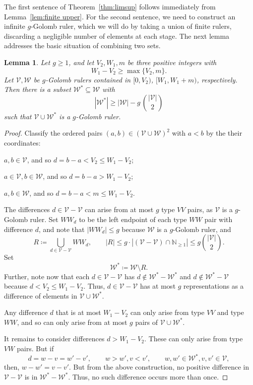 \documentclass[10pt]{article}
\newcommand{\NN}{\ensuremath{\mathbb N}}
\newcommand{\cV}{\mathcal{V}}
\newcommand{\cW}{\mathcal{W}}
\newtheorem{lem}[thm]{Lemma}
\begin{document}
The first sentence of Theorem~\ref{thm:limsup} follows immediately from Lemma~\ref{lem:finite upper}. For the second sentence, we need to construct an infinite $g$-Golomb ruler, which we will do by taking a union of finite rulers, discarding a negligible number of elements at each stage. The next lemma addresses the basic situation of combining two sets.

\begin{lem}\label{lem:splice}
  Let $g \ge 1$, and let $V_2,W_1,m$ be three positive integers with 
  \begin{equation*}
    W_1 - V_2 \ge \max \{V_2, m\}.
  \end{equation*}
  Let $\cV,\cW$ be $g$-Golomb rulers contained in $[0, V_2)$, $[W_1, W_1+m)$, respectively.
  Then there is a subset $\cW^{*} \subseteq \cW$ with
  \begin{equation*}
    |\cW^{*}| \ge |\cW| - g \,\binom{|\cV|}{2}
  \end{equation*}
  such that $\cV \cup \cW^{*}$ is a $g$-Golomb ruler.
\end{lem}

\begin{proof}
Classify the ordered pairs $(a,b)\in (\cV \cup \cW)^2$ with $a<b$ by the their coordinates:
\begin{description}[noitemsep]
    \item[type $VV$:] $a,b\in\cV$, and so $d=b-a< V_2 \le W_1-V_2$;
    \item[type $VW$:] $a\in\cV,b\in \cW$, and so $d=b-a > W_1-V_2$;
    \item[type $WW$:] $a,b\in\cW$, and so $d=b-a < m \le W_1-V_2$.
\end{description}
The differences $d\in \cV-\cV$ can arise from at most $g$ type $VV$ pairs, as $\cV$ is a $g$-Golomb ruler. Set $WW_d$ to be the left endpoint of each type $WW$ pair with difference $d$, and note that $|WW_d| \le g $ because $\cW$ is a $g$-Golomb ruler, and
    \[R \coloneqq \bigcup_{d\in \cV-\cV} WW_d, \qquad \left| R \right| \le g \cdot |(\cV-\cV)\cap\NN_{\ge 1}| \le g \binom{|\cV|}{2}.\]
Set
  \[\cW^{*}\coloneqq \cW\setminus R.\] 
Further, note now that each $d\in \cV-\cV$ has $d\not\in \cW^{*}-\cW^{*}$ and $d\not\in \cW^{*}-\cV$ because $d< V_2 \le W_1-V_2$. Thus, $d\in \cV-\cV$ has at most $g$ representations as a difference of elements in $\cV\cup \cW^{*}$.

Any difference $d$ that is at most $W_1-V_2$ can only arise from type $VV$ and type $WW$, and so can only arise from at most $g$ pairs of $\cV\cup\cW^{*}$. 

It remains to consider differences $d> W_1-V_2$. These can only arise from type $VW$ pairs. But if
\begin{equation*}
d=w - v = w' - v', \qquad w> w',v < v',\qquad w,w' \in \cW^{*},v,v' \in \cV,
\end{equation*}
then, $w - w' = v - v'$. But from the above construction, no positive difference in $\cV-\cV$ is in $\cW^{*}-\cW^{*}$. Thus, no such difference occurs more than once.
\end{proof}
\end{document}
